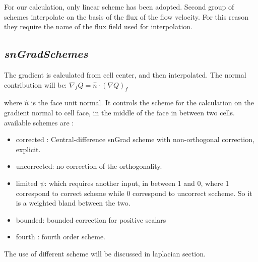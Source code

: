 \documentclass[a4paper,12pt]{article}
\begin{document}
For our calculation, only linear scheme has been adopted. Second group of schemes interpolate on the basis of the flux of the flow velocity. For this reason they require the name of the flux field used for interpolation.

\subsection{\textit{snGradSchemes}}
The gradient is calculated from cell center, and then interpolated. The normal contribution will be: 
$ \nabla_f Q = \hat{n} \cdot (\nabla Q )_f$

where $\hat{n}$ is the face unit normal. It controls the scheme for the calculation on the gradient normal to cell face, in the middle of the face in between two cells. available schemes are : \\
\begin{itemize} 

 \item {\ttfamily corrected} : Central-difference snGrad scheme with non-orthogonal correction, explicit.
  \item {\ttfamily uncorrected}: no correction of the orthogonality.
 \item {\ttfamily limited $\psi$}: which requires another input, in between 1 and 0, where 1 correspond to correct scheme while 0 correspond to uncorrect sccheme. So it is a weighted bland between the two.
 \item {\ttfamily bounded}: bounded correction for positive scalars
 \item {\ttfamily fourth} : fourth order scheme.
\end{itemize} 

The use of different scheme will be discussed in laplacian section.
\end{document}

